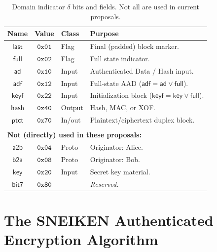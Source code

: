 \documentclass{iacrtrans}
\newcommand{\msf}[1]{\mathsf{#1}}
\newcommand{\mtt}[1]{\mathtt{#1}}
\begin{document}
	\begin{table}
	\caption{Domain indicator $\delta$ bits and fields. Not all are used
		in current proposals.	\label{tab:domsep}}
	\begin{center}
	\begin{tabular}{c c l l}
	{\bf Name}	 & {\bf Value} 	& {\bf Class} & {\bf Purpose} \\
	\hline
	$\msf{last}$ & $\mtt{0x01}$	& Flag & 
		Final (padded) block marker. \\
	$\msf{full}$ & $\mtt{0x02}$ & Flag & 
		Full state indicator. \\
	$\msf{ad}$	 & $\mtt{0x10}$	& Input & 
		Authenticated Data / Hash input. \\
	$\msf{adf}$	 & $\mtt{0x12}$	& Input & 
		Full-state AAD ($\msf{adf} = \msf{ad} \lor \msf{full}$). \\
	$\msf{keyf}$ & $\mtt{0x22}$	& Input &
		Initialization block 
		($\msf{keyf} = \msf{key} \lor \msf{full}$).	\\
	$\msf{hash}$ & $\mtt{0x40}$	& Output &
		Hash, MAC, or XOF. \\
	$\msf{ptct}$ & $\mtt{0x70}$	& In/out &
		Plaintext/ciphertext duplex block. \\
	\\
	\multicolumn{4}{l}{\bf Not (directly) used in these proposals:} \\
	$\msf{a2b}$	 & $\mtt{0x04}$	& Proto & 
		Originator: Alice.	\\
	$\msf{b2a}$	 & $\mtt{0x08}$	& Proto & 
		Originator: Bob.	\\
	$\msf{key}$	 & $\mtt{0x20}$	& Input &
		Secret key material. \\
	$\msf{bit7}$ & $\mtt{0x80}$	& & \emph{Reserved.}
	\end{tabular}
	\end{center}

	\end{table}

\section{The SNEIKEN Authenticated Encryption Algorithm}
\label{sec:sneiken}
\end{document}
